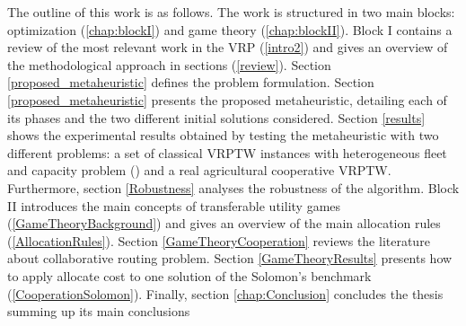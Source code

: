 The outline of this work is as follows. The work is structured in two main blocks: optimization (\ref{chap:blockI}) and game theory (\ref{chap:blockII}). 
Block I contains a review of the most relevant work in the VRP (\ref{intro2}) and gives an overview of the methodological approach in sections (\ref{review}). Section \ref{proposed_metaheuristic} defines the problem formulation. Section \ref{proposed_metaheuristic} presents the proposed metaheuristic, detailing each of its phases and the two different initial solutions considered.
Section \ref{results} shows the experimental results obtained by testing the metaheuristic with two different problems: a set of classical VRPTW instances with heterogeneous fleet and capacity problem (\cite{Solomon_1987}) and a real agricultural cooperative VRPTW. Furthermore, section \ref{Robustness} analyses the robustness of the algorithm. 
Block II introduces the main concepts of transferable utility games (\ref{GameTheoryBackground}) and gives an overview of the main allocation rules (\ref{AllocationRules}). Section \ref{GameTheoryCooperation} reviews the literature about collaborative routing problem. Section \ref{GameTheoryResults} presents how to apply allocate cost to one solution of the Solomon's benchmark (\ref{CooperationSolomon}). 
Finally, section \ref{chap:Conclusion} concludes the thesis summing up its main conclusions



